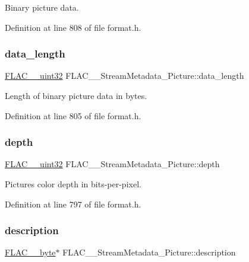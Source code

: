 Binary picture data. 

Definition at line 808 of file format.\+h.

\mbox{\label{struct_f_l_a_c_____stream_metadata___picture_acb893f63a196f70263468770a90580a4}} 
\subsubsection{\texorpdfstring{data\_length}{data\_length}}
{\footnotesize\ttfamily \mbox{\hyperlink{ordinals_8h_a9c4005ea7ef8d564b0cc993cdd0e4e5e}{F\+L\+A\+C\+\_\+\+\_\+uint32}} F\+L\+A\+C\+\_\+\+\_\+\+Stream\+Metadata\+\_\+\+Picture\+::data\+\_\+length}

Length of binary picture data in bytes. 

Definition at line 805 of file format.\+h.

\mbox{\label{struct_f_l_a_c_____stream_metadata___picture_a0f2092ddf28a6803e9c8adb7328c1967}} 
\subsubsection{\texorpdfstring{depth}{depth}}
{\footnotesize\ttfamily \mbox{\hyperlink{ordinals_8h_a9c4005ea7ef8d564b0cc993cdd0e4e5e}{F\+L\+A\+C\+\_\+\+\_\+uint32}} F\+L\+A\+C\+\_\+\+\_\+\+Stream\+Metadata\+\_\+\+Picture\+::depth}

Picture\textquotesingle{}s color depth in bits-\/per-\/pixel. 

Definition at line 797 of file format.\+h.

\mbox{\label{struct_f_l_a_c_____stream_metadata___picture_a5bbfb168b265edfb0b29cfdb71fb413c}} 
\subsubsection{\texorpdfstring{description}{description}}
{\footnotesize\ttfamily \mbox{\hyperlink{ordinals_8h_a5eb569b12d5b047cdacada4d57924ee3}{F\+L\+A\+C\+\_\+\+\_\+byte}}$\ast$ F\+L\+A\+C\+\_\+\+\_\+\+Stream\+Metadata\+\_\+\+Picture\+::description}

